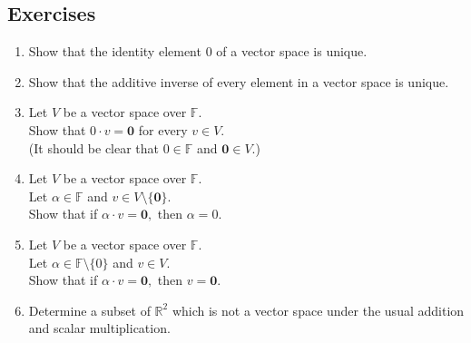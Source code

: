 \documentclass[12pt]{article}
\begin{document}
\subsection{Exercises}
\begin{enumerate}[nosep] 
	\item Show that the identity element $0$ of a vector space is unique.
	\item Show that the additive inverse of every element in a vector space is unique.
	\item Let $V$ be a vector space over $\mathbb{F}.$ \\
	Show that $0\cdot v = \mathbf{0}$ for every $v \in V.$\\
	(It should be clear that $0 \in\mathbb{F}$ and $\mathbf{0} \in V.$)
	\item Let $V$ be a vector space over $\mathbb{F}.$ \\
	Let $\alpha \in \mathbb{F}$ and $v \in V\setminus\{\mathbf{0}\}.$\\
	Show that if $\alpha\cdot v = \mathbf{0},$ then $\alpha = 0.$
	\item Let $V$ be a vector space over $\mathbb{F}.$ \\
	Let $\alpha \in \mathbb{F}\setminus\{0\}$ and $v \in V.$\\
	Show that if $\alpha\cdot v = \mathbf{0},$ then $v = \mathbf{0}.$
	\item Determine a subset of $\mathbb{R}^2$ which is not a vector space under the usual addition and scalar multiplication.
\end{enumerate}
\end{document}
